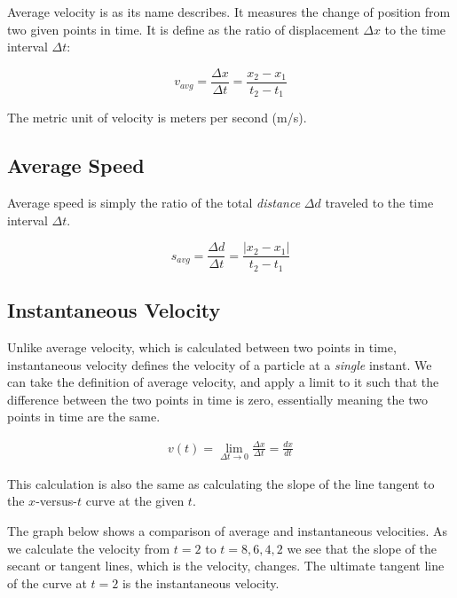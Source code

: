 \documentclass[11pt]{article}
\begin{document}
Average velocity is as its name describes. It measures the change of position from two given points in time. It is define as the ratio of displacement $\Delta x$ to the time interval $\Delta t$:

\begin{equation*}
    v_{avg} = \frac{\Delta x}{\Delta t} = \frac{x_{2} - x_{1}}{t_{2} - t_{1}}
\end{equation*}

The metric unit of velocity is meters per second (m/s). 


\subsection{Average Speed}

Average speed is simply the ratio of the total \textit{distance} $\Delta d$ traveled to the time interval $\Delta t$.

\begin{equation*}
    s_{avg} = \frac{\Delta d}{\Delta t} = \frac{|x_{2} - x_{1}|}{t_{2} - t_{1}}
\end{equation*}

\subsection{Instantaneous Velocity}

Unlike average velocity, which is calculated between two points in time, instantaneous velocity defines the velocity of a particle at a \textit{single} instant. We can take the definition of average velocity, and apply a limit to it such that the difference between the two points in time is zero, essentially meaning the two points in time are the same.

\begin{align*}
    v(t) = \lim_{\Delta t \to 0} \frac{\Delta x}{\Delta t} = \frac{dx}{dt}
\end{align*}

This calculation is also the same as calculating the slope of the line tangent to the $x$-versus-$t$ curve at the given $t$. 

The graph below shows a comparison of average and instantaneous velocities. As we calculate the velocity from $t = 2$ to $t = 8,6,4,2$ we see that the slope of the secant or tangent lines, which is the velocity, changes. The ultimate tangent line of the curve at $t = 2$ is the instantaneous velocity.
\end{document}
